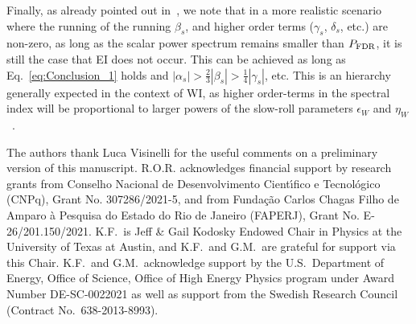 \documentclass[a4paper,11pt]{article}
\begin{document}
{}Finally, as already pointed out in~\cite{Kinney:2014jya}, we note
that in a more realistic scenario where the running of the running
$\beta_s$, and higher order terms ($\gamma_s$, $\delta_s$, etc.) are
non-zero,  as long as the scalar power spectrum remains smaller than
$P_{\rm{FDR}}$, it is still the case that EI does not occur. This can
be achieved as long as Eq.~\eqref{eq:Conclusion_1} holds and
$|\alpha_s|>\frac{2}{3}|\beta_s|>\frac{1}{4}|\gamma_s|$, etc. This is
an hierarchy generally  expected in the context of WI, as higher
order-terms in the spectral index will be proportional to larger
powers of the slow-roll parameters $\epsilon_W$ and
$\eta_W$~\cite{Das:2022ubr}.



\begin{acknowledgments}
The authors thank Luca Visinelli for the useful comments on a preliminary version of this manuscript.  R.O.R. acknowledges financial support  by research grants from
Conselho Nacional de Desenvolvimento Cient\'{\i}fico e Tecnol\'ogico
(CNPq), Grant No. 307286/2021-5, and from Funda\c{c}\~ao Carlos Chagas
Filho de Amparo \`a Pesquisa do Estado do Rio de Janeiro (FAPERJ),
Grant No. E-26/201.150/2021.  K.F.\ is Jeff \& Gail Kodosky Endowed Chair in Physics at the University of Texas at Austin, and K.F.\ and G.M.\ are grateful for support via this Chair. K.F.\ and G.M.\ acknowledge support by the U.S.\ Department of Energy, Office of Science, Office of High Energy Physics program under Award Number DE-SC-0022021 as well as support from the Swedish Research Council (Contract No.~638-2013-8993).  

\end{acknowledgments}



\end{document}
